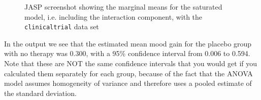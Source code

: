 \bigskip
\begin{figure}[!htb]
\begin{center}
\caption{JASP screenshot showing the marginal means for the saturated model, i.e. including the interaction component, with the \texttt{clinicaltrial} data set}
\label{fig:margmean1}
\HR
\end{center}
\end{figure}

In the output we see that the estimated mean mood gain for the placebo group with no therapy was 0.300, with a 95\% confidence interval from 0.006 to 0.594. Note that these are NOT the same confidence intervals that you would get if you calculated them separately for each group, because of the fact that the ANOVA model assumes homogeneity of variance and therefore uses a pooled estimate of the standard deviation. 

\begin{comment} %
When the model doesn't contain the interaction term, then the estimated group means will be different from the sample means. Instead of reporting the sample mean, JASP will calculate the value of the group means that would be expected on the basis of the marginal means (i.e., assuming no interaction). Using the notation we developed earlier, the estimate reported for $\mu_{rc}$, the mean for level $r$ on the (row) Factor A and level $c$ on the (column) Factor B would be $\mu_{..} + \alpha_r + \beta_c$. If there are genuinely no interactions between the two factors, this is actually a better estimate of the population mean than the raw sample mean would be. Removing the interaction term from the model, via the `Model' options in the jamovi ANOVA analysis, provides the marginal means for the analysis shown in Figure~\ref{fig:margmean2}.

\bigskip
\begin{figure}[!htb]
\begin{center}
\epsfig{file = ../img/factorialanova/margmean2.png,clip=true, width = 14cm} 
\caption{jamovi screenshot showing the marginal means for the unsaturated model, i.e. without the interaction component, with the \texttt{clinicaltrial} data set}
\label{fig:margmean2}
\HR
\end{center}
\end{figure}

\end{comment}

